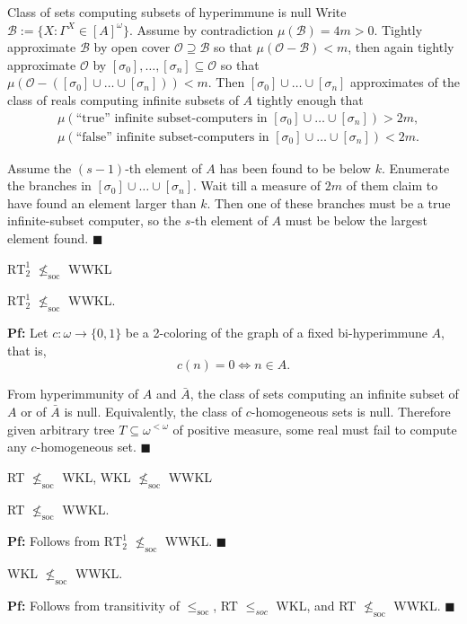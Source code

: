 \begin{frame}{Class of sets computing subsets of hyperimmune is null}
  Write $\mathcal{B} :=\{X: \Gamma^X\in[A]^\omega\}$.
  Assume by contradiction $\mu(\mathcal{B})=4m>0$. Tightly approximate
  $\mathcal{B}$ by open cover $\mathcal{O}\supseteq\mathcal{B}$ so that
  $\mu(\mathcal{O}-\mathcal{B})<m$, then again tightly approximate
  $\mathcal{O}$ by $[\sigma_0],\ldots,[\sigma_n] \subseteq\mathcal{O}$ so
  that $\mu(\mathcal{O}-([\sigma_0]\cup\ldots\cup[\sigma_n])) <m$.
  Then $[\sigma_0]\cup\ldots\cup[\sigma_n]$ approximates of the class
  of reals computing infinite subsets of $A$ tightly enough that
  \begin{align*}
    &\mu(\text{``true'' infinite subset-computers in }
    [\sigma_0]\cup\ldots\cup[\sigma_n])>2m,\\
    &\mu(\text{``false'' infinite subset-computers in }
    [\sigma_0]\cup\ldots\cup[\sigma_n])<2m.
  \end{align*}

  Assume the $(s-1)$-th element of $A$ has been found to be below $k$.
  Enumerate the branches in $[\sigma_0]\cup\ldots\cup[\sigma_n]$.  Wait
  till a measure of $2m$ of them claim to have found an element larger than
  $k$. Then one of these branches must be a true infinite-subset computer,
  so the $s$-th element of $A$ must be below the largest element found.
  $\blacksquare$
\end{frame}

\begin{frame}{$\text{RT}_2^1$ $\nleq_{\text{soc}}$ WWKL}
  \begin{thm}
    $\text{RT}_2^1$ $\nleq_{\text{soc}}$ WWKL.
  \end{thm}

  \vspace{1em}
  \textbf{Pf:} Let $c:\omega\rightarrow\{0,1\}$ be a 2-coloring of the
  graph of a fixed bi-hyperimmune $A$, that is,
  \[c(n)=0 \Leftrightarrow n\in A.\]
  
  From hyperimmunity of $A$ and $\bar{A}$, the class of sets computing an
  infinite subset of $A$ or of $\bar{A}$ is null. Equivalently, the class
  of $c$-homogeneous sets is null. Therefore given arbitrary tree
  $T\subseteq\omega^{<\omega}$ of positive measure, some real must fail to
  compute any $c$-homogeneous set. $\blacksquare$
\end{frame}

\begin{frame}{RT $\nleq_{\text{soc}}$ WKL, WKL $\nleq_{\text{soc}}$ WWKL}
  \begin{coro}
    \label{coro:rt-wwkl}
    RT $\nleq_{\text{soc}}$ WWKL.
  \end{coro}
  \textbf{Pf:} Follows from $\text{RT}_2^1$ $\nleq_{\text{soc}}$ WWKL.
  $\blacksquare$

  \vspace{2em}
  \begin{coro}
    WKL $\nleq_{\text{soc}}$ WWKL.
  \end{coro}
  \textbf{Pf:} Follows from transitivity of $\leq_\text{soc}$,
  RT $\leq_{soc}$ WKL, and RT $\nleq_{\text{soc}}$ WWKL. $\blacksquare$
\end{frame}
